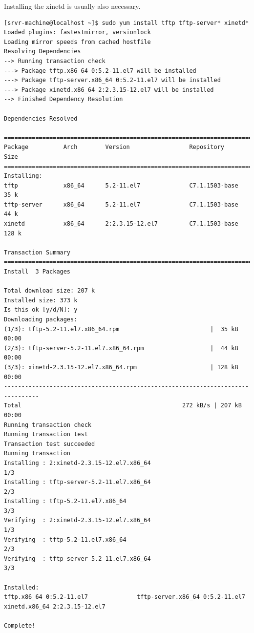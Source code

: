 \documentclass[11pt
  , a4paper
  , article
  , oneside
  , showtrims
]{memoir}
\begin{document}
Installing the xinetd is usually also necessary.

\begin{lstlisting}[style=termstyle]
[srvr-machine@localhost ~]$ sudo yum install tftp tftp-server* xinetd*
Loaded plugins: fastestmirror, versionlock
Loading mirror speeds from cached hostfile
Resolving Dependencies
--> Running transaction check
---> Package tftp.x86_64 0:5.2-11.el7 will be installed
---> Package tftp-server.x86_64 0:5.2-11.el7 will be installed
---> Package xinetd.x86_64 2:2.3.15-12.el7 will be installed
--> Finished Dependency Resolution

Dependencies Resolved

================================================================================
Package          Arch        Version                 Repository           Size
================================================================================
Installing:
tftp             x86_64      5.2-11.el7              C7.1.1503-base       35 k
tftp-server      x86_64      5.2-11.el7              C7.1.1503-base       44 k
xinetd           x86_64      2:2.3.15-12.el7         C7.1.1503-base      128 k

Transaction Summary
================================================================================
Install  3 Packages

Total download size: 207 k
Installed size: 373 k
Is this ok [y/d/N]: y
Downloading packages:
(1/3): tftp-5.2-11.el7.x86_64.rpm                          |  35 kB   00:00     
(2/3): tftp-server-5.2-11.el7.x86_64.rpm                   |  44 kB   00:00     
(3/3): xinetd-2.3.15-12.el7.x86_64.rpm                     | 128 kB   00:00     
--------------------------------------------------------------------------------
Total                                              272 kB/s | 207 kB  00:00     
Running transaction check
Running transaction test
Transaction test succeeded
Running transaction
Installing : 2:xinetd-2.3.15-12.el7.x86_64                                1/3 
Installing : tftp-server-5.2-11.el7.x86_64                                2/3 
Installing : tftp-5.2-11.el7.x86_64                                       3/3 
Verifying  : 2:xinetd-2.3.15-12.el7.x86_64                                1/3 
Verifying  : tftp-5.2-11.el7.x86_64                                       2/3 
Verifying  : tftp-server-5.2-11.el7.x86_64                                3/3 

Installed:
tftp.x86_64 0:5.2-11.el7              tftp-server.x86_64 0:5.2-11.el7        
xinetd.x86_64 2:2.3.15-12.el7        

Complete!
\end{lstlisting}
\end{document}
